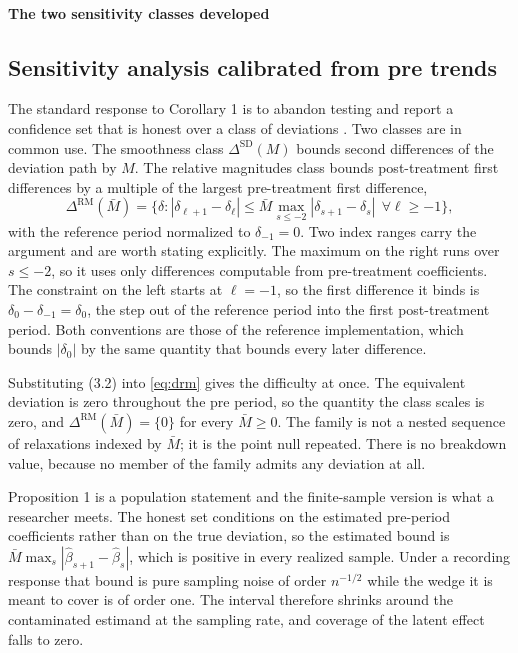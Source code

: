 \documentclass[12pt]{article}
\theoremstyle{definition}
\numberwithin{equation}{section}
\begin{document}
\paragraph{The two sensitivity classes developed}

\subsection{Sensitivity analysis calibrated from pre trends}
\label{sec:sensitivity}

The standard response to Corollary 1 is to abandon testing and
report a confidence set that is honest over a class of deviations
\citep{rambachan2023credible}. Two classes are in common use. The smoothness
class $\Delta^{\mathrm{SD}}(M)$ bounds second differences of the deviation path
by $M$. The relative magnitudes class bounds post-treatment first differences by
a multiple of the largest pre-treatment first difference,
\begin{equation}
\label{eq:drm}
\Delta^{\mathrm{RM}}(\bar M) = \Big\{\delta : |\delta_{\ell+1} - \delta_\ell|
\le \bar M \max_{s \le -2} |\delta_{s+1} - \delta_s| \ \ \forall \ell \ge -1 \Big\},
\end{equation}
with the reference period normalized to $\delta_{-1} = 0$. Two index ranges
carry the argument and are worth stating explicitly. The maximum on the right
runs over $s \le -2$, so it uses only differences computable from pre-treatment coefficients. The constraint on the left starts at $\ell = -1$, so the first
difference it binds is $\delta_0 - \delta_{-1} = \delta_0$, the step out of the
reference period into the first post-treatment period. Both conventions are
those of the reference implementation, which bounds $|\delta_0|$ by the same
quantity that bounds every later difference.

Substituting (3.2) into \eqref{eq:drm} gives the difficulty at
once. The equivalent deviation is zero throughout the pre period, so the
quantity the class scales is zero, and $\Delta^{\mathrm{RM}}(\bar M) = \{0\}$
for every $\bar M \ge 0$. The family is not a nested sequence of relaxations
indexed by $\bar M$; it is the point null repeated. There is no breakdown value,
because no member of the family admits any deviation at all.

Proposition 1 is a population statement and the finite-sample version is what a researcher meets. The honest set conditions on the estimated
pre-period coefficients rather than on the true deviation, so the estimated
bound is $\bar M \max_s |\widehat\beta_{s+1} - \widehat\beta_s|$, which is
positive in every realized sample. Under a recording response that bound is pure
sampling noise of order $n^{-1/2}$ while the wedge it is meant to cover is of
order one. The interval therefore shrinks around the contaminated estimand at
the sampling rate, and coverage of the latent effect falls to zero.
\end{document}
